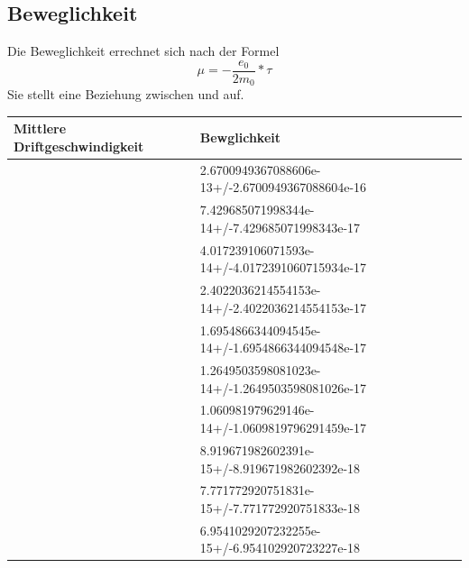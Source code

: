 \documentclass[titlepage=firstcover, captions=tableheading]{scrartcl}
\begin{document}
\subsection{Beweglichkeit \mu}
Die Beweglichkeit \mu errechnet sich nach der Formel 
\begin{equation}
    \mu=-\frac{e_0}{2m_0}*\tau
\end{equation}
Sie stellt eine Beziehung zwischen \tau und \mu auf.
\begin{center}
    \begin{tabular}{ll}
        \toprule
        Mittlere Driftgeschwindigkeit & Bewglichkeit \\
        \midrule  
               & 2.6700949367088606e-13+/-2.6700949367088604e-16\\
               & 7.429685071998344e-14+/-7.429685071998343e-17\\
               & 4.017239106071593e-14+/-4.0172391060715934e-17\\
               & 2.4022036214554153e-14+/-2.4022036214554153e-17\\
               & 1.6954866344094545e-14+/-1.6954866344094548e-17\\
               & 1.2649503598081023e-14+/-1.2649503598081026e-17\\
               & 1.060981979629146e-14+/-1.0609819796291459e-17\\
               & 8.919671982602391e-15+/-8.919671982602392e-18   \\
               & 7.771772920751831e-15+/-7.771772920751833e-18 \\
               & 6.9541029207232255e-15+/-6.954102920723227e-18  \\
        \bottomrule
    \end{tabular}
\end{center}
\end{document}
